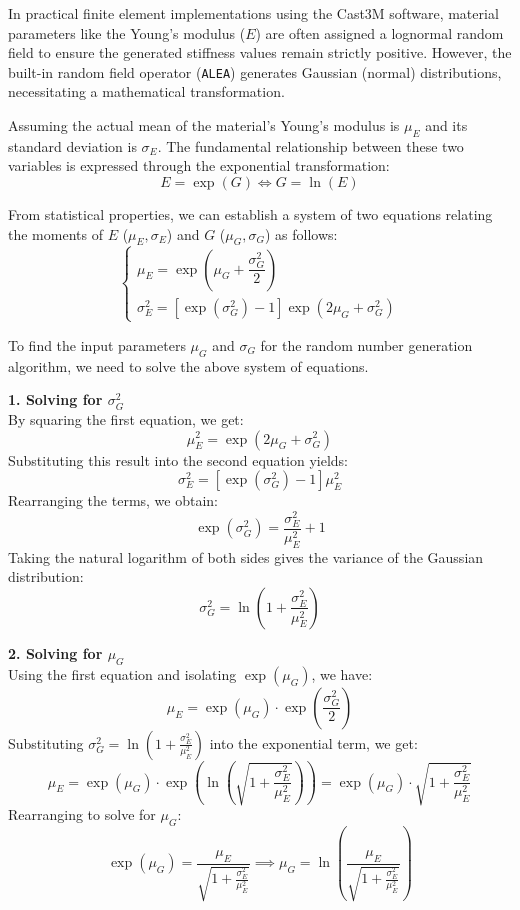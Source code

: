 \documentclass[a4paper,12pt,twoside]{report}     %
\begin{document}
In practical finite element implementations using the Cast3M software, material parameters like the Young's modulus ($E$) are often assigned a lognormal random field to ensure the generated stiffness values remain strictly positive. However, the built-in random field operator (\texttt{ALEA}) generates Gaussian (normal) distributions, necessitating a mathematical transformation.

Assuming the actual mean of the material's Young's modulus is $\mu_E$ and its standard deviation is $\sigma_E$. The fundamental relationship between these two variables is expressed through the exponential transformation:
\[
E = \exp(G) \iff G = \ln(E)
\]

From statistical properties, we can establish a system of two equations relating the moments of $E$ ($\mu_E, \sigma_E$) and $G$ ($\mu_G, \sigma_G$) as follows:
\begin{equation}
\begin{cases}
\mu_E = \exp\left(\mu_G + \dfrac{\sigma_G^2}{2}\right) \\
\sigma_E^2 = \left[ \exp(\sigma_G^2) - 1 \right] \exp(2\mu_G + \sigma_G^2)
\end{cases}
\end{equation}

To find the input parameters $\mu_G$ and $\sigma_G$ for the random number generation algorithm, we need to solve the above system of equations.

\textbf{1. Solving for $\sigma_G^2$} \\
By squaring the first equation, we get:
\[
\mu_E^2 = \exp(2\mu_G + \sigma_G^2)
\]
Substituting this result into the second equation yields:
\[
\sigma_E^2 = \left[ \exp(\sigma_G^2) - 1 \right] \mu_E^2
\]
Rearranging the terms, we obtain:
\[
\exp(\sigma_G^2) = \frac{\sigma_E^2}{\mu_E^2} + 1
\]
Taking the natural logarithm of both sides gives the variance of the Gaussian distribution:
\[
\sigma_G^2 = \ln\left(1 + \frac{\sigma_E^2}{\mu_E^2}\right)
\]

\textbf{2. Solving for $\mu_G$} \\
Using the first equation and isolating $\exp(\mu_G)$, we have:
\[
\mu_E = \exp(\mu_G) \cdot \exp\left(\dfrac{\sigma_G^2}{2}\right)
\]
Substituting $\sigma_G^2 = \ln\left(1 + \frac{\sigma_E^2}{\mu_E^2}\right)$ into the exponential term, we get:
\[
\mu_E = \exp(\mu_G) \cdot \exp\left(\ln\left(\sqrt{1 + \frac{\sigma_E^2}{\mu_E^2}}\right)\right) = \exp(\mu_G) \cdot \sqrt{1 + \frac{\sigma_E^2}{\mu_E^2}}
\]
Rearranging to solve for $\mu_G$:
\[
\exp(\mu_G) = \frac{\mu_E}{\sqrt{1 + \frac{\sigma_E^2}{\mu_E^2}}} \implies \mu_G = \ln\left(\frac{\mu_E}{\sqrt{1 + \frac{\sigma_E^2}{\mu_E^2}}}\right)
\]
\end{document}
